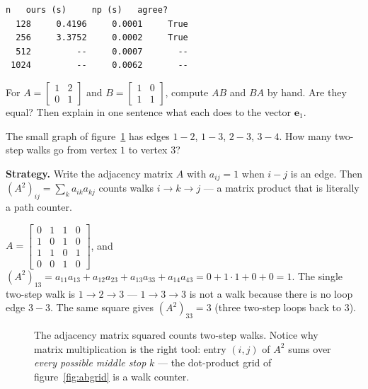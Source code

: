 \begin{lstlisting}[caption={Output of listing~\ref{lst:matmul}. Our loop agrees exactly with the library — the rule is the same; doubling $n$ multiplies our time by $\sim8$ ($2n^3$ multiply-adds), while LAPACK stays four orders of magnitude faster by blocking for cache.}]
    n   ours (s)     np (s)   agree?
  128     0.4196     0.0001     True
  256     3.3752     0.0002     True
  512         --     0.0007       --
 1024         --     0.0062       --
\end{lstlisting}

\begin{exercise}[easy]
For $A=\begin{bmatrix}1&2\\0&1\end{bmatrix}$ and $B=\begin{bmatrix}1&0\\1&1\end{bmatrix}$, compute $AB$ and $BA$ by hand. Are they equal? Then explain in one sentence what each does to the vector $\mathbf{e}_1$.
\end{exercise}

\begin{example}\label{ex:adjacency}
The small graph of figure~\ref{fig:graph} has edges
$1{-}2$, $1{-}3$, $2{-}3$, $3{-}4$. How many two-step walks go from
vertex $1$ to vertex $3$?
\par\smallskip
\textbf{Strategy.} Write the adjacency matrix $A$ with $a_{ij}=1$ when
$i{-}j$ is an edge. Then $(A^2)_{ij}=\sum_k a_{ik}a_{kj}$ counts walks
$i\to k\to j$ --- a matrix product that is literally a path counter.
\begin{solution}
$A=\begin{bmatrix}0&1&1&0\\1&0&1&0\\1&1&0&1\\0&0&1&0\end{bmatrix}$,
and
$(A^2)_{13}=a_{11}a_{13}+a_{12}a_{23}+a_{13}a_{33}+a_{14}a_{43}
 =0+1\cdot1+0+0=1$. The single two-step walk is $1\to2\to3$ ---
$1\to3\to3$ is not a walk because there is no loop edge $3{-}3$.
The same square gives $(A^2)_{33}=3$ (three two-step loops back to 3).
\checkmark
\end{solution}
\end{example}

\begin{figure}[htbp]\centering

\caption{The adjacency matrix squared counts two-step walks. Notice
why matrix multiplication is the right tool: entry $(i,j)$ of $A^2$
sums over \emph{every possible middle stop} $k$ --- the dot-product
grid of figure~\ref{fig:abgrid} is a walk counter.}
\label{fig:graph}
\end{figure}


